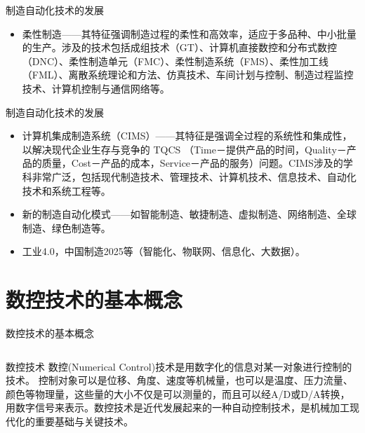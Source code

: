 \documentclass[UTF8,zihao=-4]{ctexbeamer}
\begin{document}
\begin{frame}[<+->]{制造自动化技术的发展}
\begin{itemize}
	\item 柔性制造——其特征强调制造过程的柔性和高效率，适应于多品种、中小批量的生产。涉及的技术包括成组技术（GT）、计算机直接数控和分布式数控（DNC）、柔性制造单元（FMC）、柔性制造系统（FMS）、柔性加工线（FML）、离散系统理论和方法、仿真技术、车间计划与控制、制造过程监控技术、计算机控制与通信网络等。
	
\end{itemize}
\end{frame}

\begin{frame}[<+->]{制造自动化技术的发展}
\begin{itemize}	
	\item 计算机集成制造系统（CIMS）——其特征是强调全过程的系统性和集成性，以解决现代企业生存与竞争的 TQCS （Time－提供产品的时间，Quality－产品的质量，Cost－产品的成本，Service－产品的服务）问题。CIMS涉及的学科非常广泛，包括现代制造技术、管理技术、计算机技术、信息技术、自动化技术和系统工程等。
	\item 新的制造自动化模式——如智能制造、敏捷制造、虚拟制造、网络制造、全球制造、绿色制造等。
	\item 工业4.0，中国制造2025等（智能化、物联网、信息化、大数据）。
\end{itemize}
\end{frame}

\section{数控技术的基本概念}

\begin{frame}{数控技术的基本概念}
\begin{columns}
	\begin{block}{\centering 数控技术}
数控(Numerical Control)技术是用数字化的信息对某一对象进行控制的技术。
控制对象可以是位移、角度、速度等机械量，也可以是温度、压力流量、颜色等物理量，这些量的大小不仅是可以测量的，而且可以经A/D或D/A转换，用数字信号来表示。数控技术是近代发展起来的一种自动控制技术，是机械加工现代化的重要基础与关键技术。
	\end{block}
\end{columns}
\end{frame}
\end{document}
